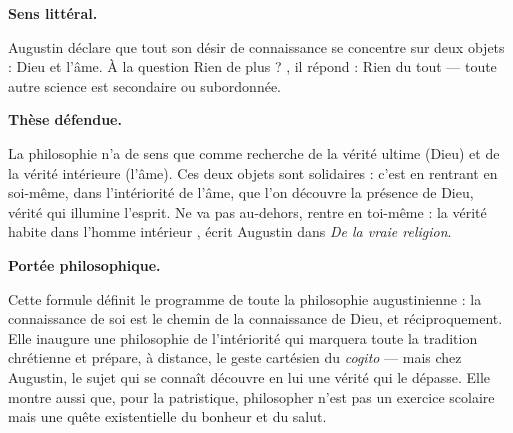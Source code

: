 \documentclass[11pt]{article}
\begin{document}
\begin{corrige}

\textbf{Sens littéral.}\par Augustin déclare que tout son désir de connaissance se concentre sur deux objets : Dieu et l'âme. À la question \guillemotleft Rien de plus ? \guillemotright, il répond : \guillemotleft Rien du tout \guillemotright — toute autre science est secondaire ou subordonnée.

\textbf{Thèse défendue.}\par La philosophie n'a de sens que comme recherche de la vérité ultime (Dieu) et de la vérité intérieure (l'âme). Ces deux objets sont solidaires : c'est en rentrant en soi-même, dans l'intériorité de l'âme, que l'on découvre la présence de Dieu, vérité qui illumine l'esprit. \guillemotleft Ne va pas au-dehors, rentre en toi-même : la vérité habite dans l'homme intérieur \guillemotright, écrit Augustin dans \emph{De la vraie religion}.

\textbf{Portée philosophique.}\par Cette formule définit le programme de toute la philosophie augustinienne : la connaissance de soi est le chemin de la connaissance de Dieu, et réciproquement. Elle inaugure une philosophie de l'intériorité qui marquera toute la tradition chrétienne et prépare, à distance, le geste cartésien du \emph{cogito} — mais chez Augustin, le sujet qui se connaît découvre en lui une vérité qui le dépasse. Elle montre aussi que, pour la patristique, philosopher n'est pas un exercice scolaire mais une quête existentielle du bonheur et du salut.

\end{corrige}
\end{document}
